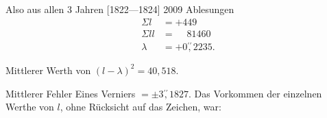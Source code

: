 \par\noindent\hspace*{\parindent}Also aus allen 3 Jahren [1822---1824] 2009 Ablesungen
\[
\begin{aligned}
\Sigma l&=+449\\
\Sigma ll&=\phantom{+}81460\\
\lambda&=+0\overset{\prime\prime}{,}2235.
\end{aligned}
\]
\par\noindent\hspace*{\parindent}Mittlerer Werth von $(l-\lambda)^2=40{,}518$.
\par\noindent\hspace*{\parindent}Mittlerer Fehler Eines Verniers $=\pm3\overset{\prime\prime}{,}1827$. Das Vorkommen der einzelnen Werthe von $l$, ohne Rücksicht auf das Zeichen, war:

